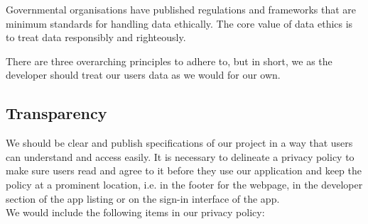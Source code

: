 Governmental organisations have published regulations  and frameworks
 that are minimum standards for handling data ethically. The core value of data ethics 
is to treat data responsibly and righteously.

There are three overarching principles to adhere to, but in short, we as the developer should treat our 
users\textsc{} data as we would for our own.

\subsection{Transparency}
We should be clear and publish specifications of our project in a way that users can understand and access
easily. It is necessary to delineate a privacy policy to make sure users read and agree to it before they use
our application and keep the policy at a prominent location, i.e. in the footer for the webpage, in the developer
section of the app listing or on the sign-in interface of the app.\\We would include the following items in our privacy policy:
